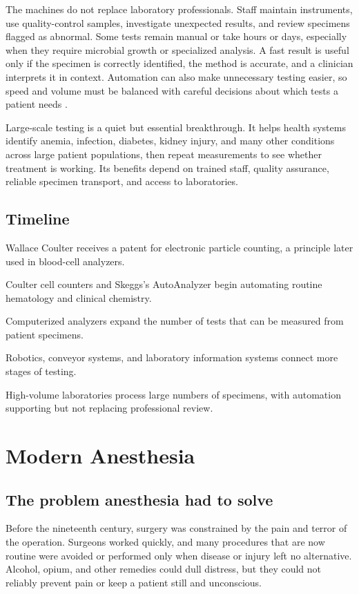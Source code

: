 \documentclass[12pt,oneside]{book}
\begin{document}
The machines do not replace laboratory professionals. Staff maintain
instruments, use quality-control samples, investigate unexpected results,
and review specimens flagged as abnormal. Some tests remain manual or take
hours or days, especially when they require microbial growth or specialized
analysis. A fast result is useful only if the specimen is correctly
identified, the method is accurate, and a clinician interprets it in context.
Automation can also make unnecessary testing easier, so speed and volume
must be balanced with careful decisions about which tests a patient needs
\cite{armbrusterLabAutomation}.

Large-scale testing is a quiet but essential breakthrough. It helps health
systems identify anemia, infection, diabetes, kidney injury, and many other
conditions across large patient populations, then repeat measurements to
see whether treatment is working. Its benefits depend on trained staff,
quality assurance, reliable specimen transport, and access to laboratories.

\section*{Timeline}
\begin{description}[leftmargin=2.3cm,style=nextline]
  \item[1953] Wallace Coulter receives a patent for electronic particle counting, a principle later used in blood-cell analyzers.
  \item[1950s] Coulter cell counters and Skeggs's AutoAnalyzer begin automating routine hematology and clinical chemistry.
  \item[1970s] Computerized analyzers expand the number of tests that can be measured from patient specimens.
  \item[1980s onward] Robotics, conveyor systems, and laboratory information systems connect more stages of testing.
  \item[Today] High-volume laboratories process large numbers of specimens, with automation supporting but not replacing professional review.
\end{description}

\chapter[Modern Anesthesia]{Modern Anesthesia}

\section{The problem anesthesia had to solve}
Before the nineteenth century, surgery was constrained by the pain and terror
of the operation. Surgeons worked quickly, and many procedures that are now
routine were avoided or performed only when disease or injury left no
alternative. Alcohol, opium, and other remedies could dull distress, but they
could not reliably prevent pain or keep a patient still and unconscious.
\end{document}
